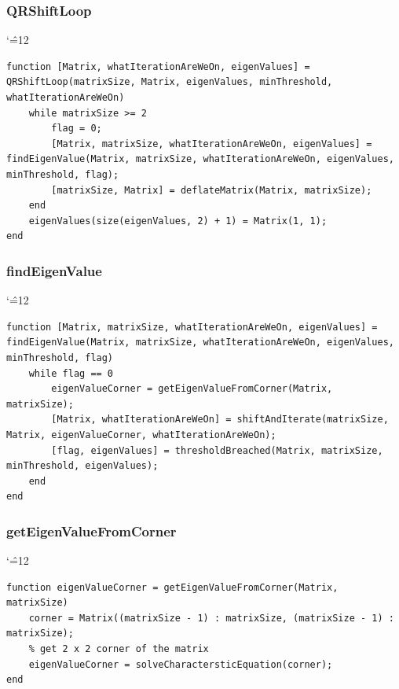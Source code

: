 \documentclass[12pt]{report}
\newenvironment{simplechar}{%
   \catcode`\^=12
}{}
\begin{document}
\newpage
\subsubsection{QRShiftLoop}
\begin{simplechar}
\begin{lstlisting}
function [Matrix, whatIterationAreWeOn, eigenValues] = QRShiftLoop(matrixSize, Matrix, eigenValues, minThreshold, whatIterationAreWeOn)
    while matrixSize >= 2
        flag = 0;
        [Matrix, matrixSize, whatIterationAreWeOn, eigenValues] = findEigenValue(Matrix, matrixSize, whatIterationAreWeOn, eigenValues, minThreshold, flag);
        [matrixSize, Matrix] = deflateMatrix(Matrix, matrixSize);
    end
    eigenValues(size(eigenValues, 2) + 1) = Matrix(1, 1);
end
\end{lstlisting}
\end{simplechar}

\subsubsection{findEigenValue}
\begin{simplechar}
\begin{lstlisting}
function [Matrix, matrixSize, whatIterationAreWeOn, eigenValues] = findEigenValue(Matrix, matrixSize, whatIterationAreWeOn, eigenValues, minThreshold, flag)
    while flag == 0
        eigenValueCorner = getEigenValueFromCorner(Matrix, matrixSize);
        [Matrix, whatIterationAreWeOn] = shiftAndIterate(matrixSize, Matrix, eigenValueCorner, whatIterationAreWeOn);
        [flag, eigenValues] = thresholdBreached(Matrix, matrixSize, minThreshold, eigenValues);
    end
end

\end{lstlisting}
\end{simplechar}

\newpage
\subsubsection{getEigenValueFromCorner}
\begin{simplechar}
\begin{lstlisting}
function eigenValueCorner = getEigenValueFromCorner(Matrix, matrixSize)
    corner = Matrix((matrixSize - 1) : matrixSize, (matrixSize - 1) : matrixSize);
    % get 2 x 2 corner of the matrix
    eigenValueCorner = solveCharactersticEquation(corner);
end

\end{lstlisting}
\end{simplechar}
\end{document}
